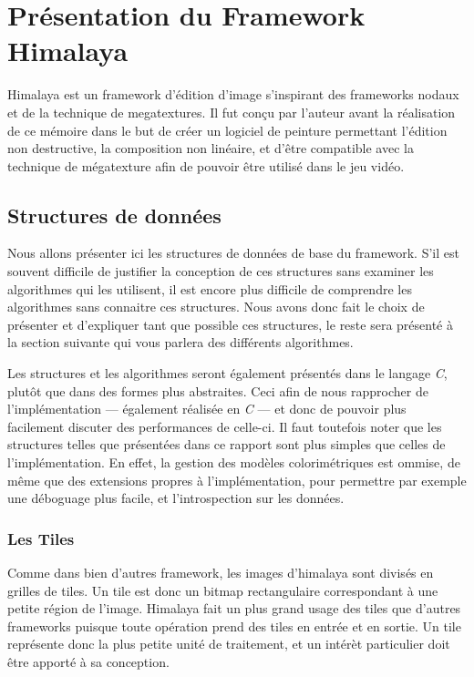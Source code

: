 \chapter{Présentation du Framework Himalaya}
	Himalaya est un framework d'édition d'image s'inspirant des frameworks nodaux et de la technique de megatextures. Il fut conçu par l'auteur avant la
	réalisation de ce mémoire dans le but de créer un logiciel de peinture permettant l'édition non destructive, la composition non linéaire, et d'être
	compatible avec la technique de mégatexture afin de pouvoir être utilisé dans le jeu vidéo. 


	\section{Structures de données}
		Nous allons présenter ici les structures de données de base du framework. S'il est souvent difficile de justifier la conception de ces structures
		sans examiner les algorithmes qui les utilisent, il est encore plus difficile de comprendre les algorithmes sans connaitre ces structures.
		Nous avons donc fait le choix de présenter et d'expliquer tant que possible ces structures, le reste sera présenté à la section suivante qui
		vous parlera des différents algorithmes.

		Les structures et les algorithmes seront également présentés dans le langage \emph{C}, plutôt que dans des formes plus abstraites. Ceci afin de nous
		rapprocher de l'implémentation --- également réalisée en \emph{C} --- et donc de pouvoir plus facilement discuter des performances de celle-ci. 
		Il faut toutefois noter que les structures telles que présentées dans ce rapport sont plus simples que celles de l'implémentation. En effet, 
		la gestion des modèles colorimétriques est ommise, de même que des extensions propres à l'implémentation, pour permettre par exemple une
		déboguage plus facile, et l'introspection sur les données. 

		\subsection{Les Tiles}
		Comme dans bien d'autres framework, les images d'himalaya sont divisés en grilles de tiles. Un tile est donc un bitmap rectangulaire correspondant
		à une petite région de l'image. Himalaya fait un plus grand usage des tiles que d'autres frameworks puisque toute opération prend des tiles
		en entrée et en sortie. Un tile représente donc la plus petite unité de traitement, et un intérèt particulier doit être apporté à sa conception.

